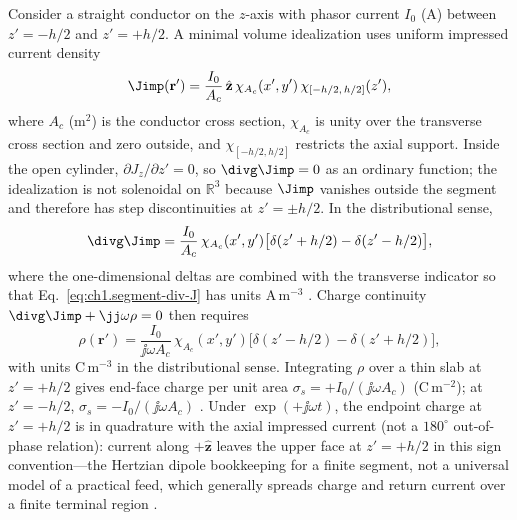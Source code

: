 \begin{example}
\label{ex:ch1.green-dipole-element}
Consider a straight conductor on the $z$-axis with phasor current $I_0$ (A) between $z'=-h/2$ and $z'=+h/2$. A minimal volume idealization uses uniform impressed current density
\[
\Jimp(\mathbf{r}')
=\frac{I_0}{A_c}\,\hat{\mathbf{z}}\,
\chi_{A_c}(x',y')\,\chi_{[-h/2,\,h/2]}(z'),
\]
where $A_c$ (m$^2$) is the conductor cross section, $\chi_{A_c}$ is unity over the transverse cross section and zero outside, and $\chi_{[-h/2,h/2]}$ restricts the axial support. Inside the open cylinder, $\partial J_z/\partial z'=0$, so $\divg\Jimp=0$ as an ordinary function; the idealization is not solenoidal on $\mathbb{R}^3$ because $\Jimp$ vanishes outside the segment and therefore has step discontinuities at $z'=\pm h/2$. In the distributional sense,
\begin{equation}
\label{eq:ch1.segment-div-J}
\divg\Jimp
=\frac{I_0}{A_c}\,\chi_{A_c}(x',y')\bigl[\delta(z'+h/2)-\delta(z'-h/2)\bigr],
\end{equation}
where the one-dimensional deltas are combined with the transverse indicator so that Eq.~\eqref{eq:ch1.segment-div-J} has units A\,m$^{-3}$ \cite{jackson1999,stratton1941}. Charge continuity $\divg\Jimp+\jj\omega\rho=0$ then requires
\begin{equation}
\label{eq:ch1.segment-end-charge}
\rho(\mathbf{r}')
=\frac{I_0}{\jj\omega A_c}\,\chi_{A_c}(x',y')\bigl[\delta(z'-h/2)-\delta(z'+h/2)\bigr],
\end{equation}
with units C\,m$^{-3}$ in the distributional sense. Integrating $\rho$ over a thin slab at $z'=+h/2$ gives end-face charge per unit area $\sigma_s=+I_0/(\jj\omega A_c)$ (C\,m$^{-2}$); at $z'=-h/2$, $\sigma_s=-I_0/(\jj\omega A_c)$ \cite{jackson1999,stratton1941}. Under $\exp(+\jj\omega t)$, the endpoint charge at $z'=+h/2$ is in quadrature with the axial impressed current (not a $180^\circ$ out-of-phase relation): current along $+\hat{\mathbf{z}}$ leaves the upper face at $z'=+h/2$ in this sign convention---the Hertzian dipole bookkeeping for a finite segment, not a universal model of a practical feed, which generally spreads charge and return current over a finite terminal region \cite{stratton1941,jackson1999}.


\end{example}
